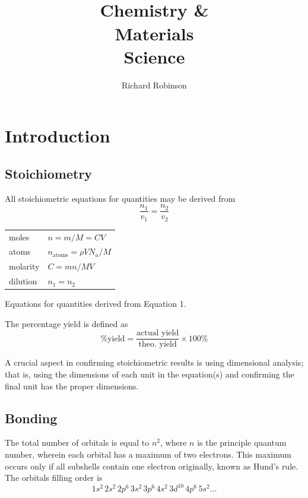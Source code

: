 \documentclass{tufte-book}
\title{\\ Chemistry \& \\ Materials \\ Science}
\author{Richard Robinson}
\begin{document}
\frontmatter
\maketitle
\tableofcontents

\setlength{\parindent}{0pt}

\mainmatter



\chapter{Introduction}

\section{Stoichiometry}

All stoichiometric equations for quantities may be derived from \begin{equation}
  \frac{n_1}{v_1} = \frac{n_2}{v_2}
\end{equation}

\begin{marginfigure}
  \begin{center}
    \begin{tabular}{ll}
      moles & $n = m/M = CV$ \\
      atoms & $n_{\mathrm{atoms}} = \rho V N_a / M$ \\
      molarity & $C = mn/MV$ \\
      dilution & $n_1 = n_2$
    \end{tabular} \phantom{mm}
  \end{center}
  \caption[]{Equations for quantities derived from Equation 1.}
\end{marginfigure}

The percentage yield is defined as \begin{equation}
  \text{\% yield} = \frac{\text{actual yield}}{\text{theo. yield}} \times 100 \%
\end{equation}

A crucial aspect in confirming stoichiometric results is using dimensional analysis; that is, using the dimensions of each unit in the equation(s) and confirming the final unit has the proper dimensions.

\section{Bonding}
The total number of orbitals is equal to $n^2$, where $n$ is the principle quantum number, wherein each orbital has a maximum of two electrons. This maximum occurs only if all subshells contain one electron originally, known as Hund's rule. The orbitals filling order is \begin{equation}
  1s^2 \, 2s^2 \, 2p^6 \, 3s^2 \, 3p^6 \, 4s^2 \, 3d^{10} \, 4p^6 \, 5s^2 \dots
\end{equation}
\end{document}

